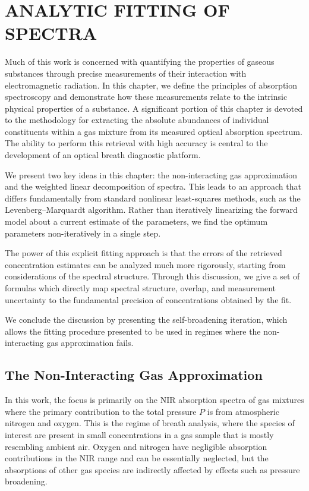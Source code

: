 \documentclass[8pt,a4paper]{report}
\begin{document}
	
	\chapter{ANALYTIC FITTING OF SPECTRA} \label{chap:fitting_spectra}
	Much of this work is concerned with quantifying the properties of gaseous substances through precise measurements of their interaction with electromagnetic radiation. In this chapter, we define the principles of absorption spectroscopy and demonstrate how these measurements relate to the intrinsic physical properties of a substance. A significant portion of this chapter is devoted to the methodology for extracting the absolute abundances of individual constituents within a gas mixture from its measured optical absorption spectrum. The ability to perform this retrieval with high accuracy is central to the development of an optical breath diagnostic platform.
	
	We present two key ideas in this chapter: the non-interacting gas approximation and the weighted linear decomposition of spectra. This leads to an approach that differs fundamentally from standard nonlinear least-squares methods, such as the Levenberg–Marquardt algorithm. Rather than iteratively linearizing the forward model about a current estimate of the parameters, we find the optimum parameters non-iteratively in a single step.
	
	The power of this explicit fitting approach is that the errors of the retrieved concentration estimates can be analyzed much more rigorously, starting from considerations of the spectral structure. Through this discussion, we give a set of formulas which directly map spectral structure, overlap, and measurement uncertainty to the fundamental precision of concentrations obtained by the fit.
	
	We conclude the discussion by presenting the self-broadening iteration, which allows the fitting procedure presented to be used in regimes where the non-interacting gas approximation fails.
	
	
	\section{The Non-Interacting Gas Approximation} \label{sec:non_interacting_gas}
	In this work, the focus is primarily on the NIR absorption spectra of gas mixtures where the primary contribution to the total pressure $P$ is from atmospheric nitrogen and oxygen. This is the regime of breath analysis, where the species of interest are present in small concentrations in a gas sample that is mostly resembling ambient air. Oxygen and nitrogen have negligible absorption contributions in the NIR range and can be essentially neglected, but the absorptions of other gas species are indirectly affected by effects such as pressure broadening.
	
\end{document}
